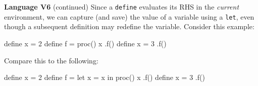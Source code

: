 \begin{minipage}[t]{\sw}
\slidenumber
\LARGE
{\bf Language V6} (continued)\exx
Since a \verb'define' evaluates its RHS in the {\em current} environment,
we can capture (and save) the value of a variable using a \verb'let',
even though a subsequent definition may redefine the variable.
Consider this example:
\begin{qv}
define x = 2
define f = proc() x %
.f()                %
define x = 3        %
.f()                %
\end{qv}
Compare this to the following:
\begin{qv}
define x = 2
define f =
  let
    x = x           %
  in
    proc() x        %
.f()                %
define x = 3        %
.f()                %
\end{qv}
\end{minipage}
\clearpage
